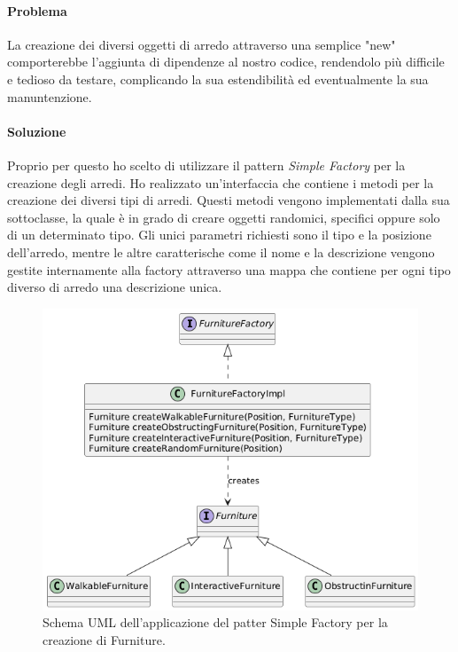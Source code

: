 \documentclass[a4paper,12pt]{report}
\begin{document}
\paragraph{Problema} La creazione dei diversi oggetti di arredo attraverso una semplice "new" comporterebbe
l'aggiunta di dipendenze al nostro codice, rendendolo più difficile e tedioso da testare, 
complicando la sua estendibilità ed eventualmente la sua manuntenzione. 
\paragraph{Soluzione} Proprio per questo ho scelto di utilizzare il pattern \textit{Simple Factory} per la 
creazione degli arredi. Ho realizzato un'interfaccia che contiene i metodi per la creazione dei diversi
tipi di arredi. Questi metodi vengono implementati dalla sua sottoclasse, la quale è in grado di creare 
oggetti randomici, specifici oppure solo di un determinato tipo. Gli unici parametri richiesti sono il tipo
e la posizione dell'arredo, mentre le altre caratterische come il nome e la descrizione vengono gestite
internamente alla factory attraverso una mappa che contiene per ogni tipo diverso di arredo una descrizione unica.

\begin{figure}[H]
	\centering{}
	\includegraphics[width=\textwidth]{img/furnitureSimpleFactory.png}
	\caption{Schema UML dell'applicazione del patter Simple Factory per la creazione di Furniture.}
	\label{img:furnitureSimpleFactory}
\end{figure}
\end{document}

